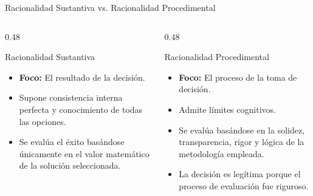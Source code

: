 \documentclass[aspectratio=169, 10pt]{beamer}
\begin{document}
\begin{frame}{Racionalidad Sustantiva vs. Racionalidad Procedimental}
    \begin{columns}[T]
        \begin{column}{0.48\textwidth}
            \begin{block}{Racionalidad Sustantiva}
                \begin{itemize}
                    \item \textbf{Foco:} El resultado de la decisión.
                    \item Supone consistencia interna perfecta y conocimiento de todas las opciones.
                    \item Se evalúa el éxito basándose únicamente en el valor matemático de la solución seleccionada.
                \end{itemize}
            \end{block}
        \end{column}
        
        \begin{column}{0.48\textwidth}
            \begin{exampleblock}{Racionalidad Procedimental}
                \begin{itemize}
                    \item \textbf{Foco:} El proceso de la toma de decisión.
                    \item Admite límites cognitivos.
                    \item Se evalúa basándose en la solidez, transparencia, rigor y lógica de la metodología empleada.
                    \item La decisión es legítima porque el proceso de evaluación fue riguroso.
                \end{itemize}
            \end{exampleblock}
        \end{column}
    \end{columns}
\end{frame}
\end{document}
